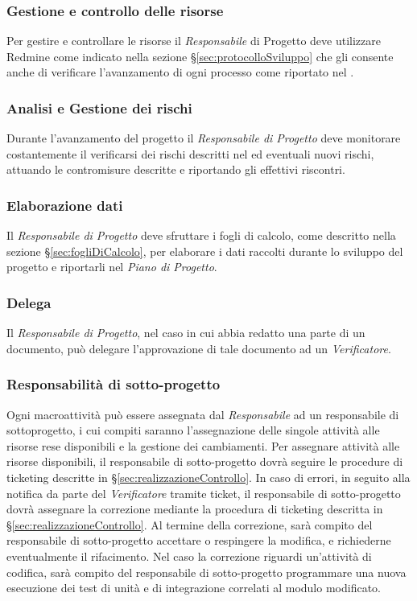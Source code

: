 \subsubsection{Gestione e controllo delle risorse}
Per gestire e controllare le risorse il \emph{Responsabile} di Progetto deve utilizzare Redmine come indicato nella sezione \S\ref{sec:protocolloSviluppo} che gli consente anche di verificare l’avanzamento di ogni processo come riportato nel \href{run:../../Esterni/\fPianoDiProgetto}{\fEscapePianoDiProgetto} .
\subsubsection{Analisi e Gestione dei rischi}
Durante l’avanzamento del progetto il \emph{Responsabile di Progetto} deve monitorare costantemente il verificarsi dei rischi descritti nel \href{run:../../Esterni/\fPianoDiProgetto}{\fEscapePianoDiProgetto} ed eventuali nuovi rischi, attuando le contromisure descritte e riportando gli effettivi riscontri.

\subsubsection{Elaborazione dati}
Il \emph{Responsabile di Progetto} deve sfruttare i fogli di calcolo, come descritto nella sezione \S\ref{sec:fogliDiCalcolo}, per elaborare i dati raccolti durante lo sviluppo del progetto e riportarli nel \emph{Piano di Progetto}.

\subsubsection{Delega}
\label{sec:delega}
Il \emph{Responsabile di Progetto}, nel caso in cui abbia redatto una parte di un documento, può delegare l'approvazione di tale documento ad un \emph{Verificatore}.
\subsubsection{Responsabilità di sotto-progetto}
Ogni macroattività può essere assegnata dal \emph{Responsabile} ad un responsabile di sottoprogetto, i cui compiti saranno l’assegnazione delle singole attività alle risorse rese disponibili e la gestione dei cambiamenti.
Per assegnare attività alle risorse disponibili, il responsabile di sotto-progetto dovrà seguire le procedure di ticketing descritte in \S\ref{sec:realizzazioneControllo}.
In caso di errori, in seguito alla notifica da parte del \emph{Verificatore} tramite ticket, il responsabile di sotto-progetto dovrà assegnare la correzione mediante la procedura di ticketing descritta in \S\ref{sec:realizzazioneControllo}. Al termine della correzione, sarà compito del responsabile di sotto-progetto accettare o respingere la modifica, e richiederne eventualmente il rifacimento.
Nel caso la correzione riguardi un’attività di codifica, sarà compito del responsabile di sotto-progetto programmare una nuova esecuzione dei test di unità e di integrazione correlati al modulo modificato.

